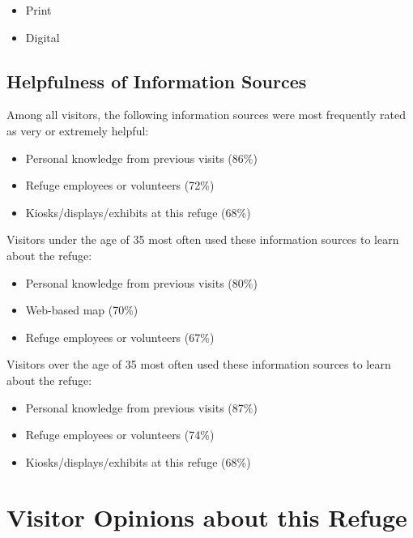 \documentclass[]{book}
\providecommand{\tightlist}{%
  \setlength{\itemsep}{0pt}\setlength{\parskip}{0pt}}
\begin{document}
\begin{itemize}
\tightlist
\item
  Print
\item
  Digital
\end{itemize}

\section{Helpfulness of Information
Sources}\label{helpfulness-of-information-sources}

Among all visitors, the following information sources were most
frequently rated as very or extremely helpful:

\begin{itemize}
\tightlist
\item
  Personal knowledge from previous visits (86\%)
\item
  Refuge employees or volunteers (72\%)
\item
  Kiosks/displays/exhibits at this refuge (68\%)
\end{itemize}

Visitors under the age of 35 most often used these information sources
to learn about the refuge:

\begin{itemize}
\tightlist
\item
  Personal knowledge from previous visits (80\%)
\item
  Web-based map (70\%)
\item
  Refuge employees or volunteers (67\%)
\end{itemize}

Visitors over the age of 35 most often used these information sources to
learn about the refuge:

\begin{itemize}
\tightlist
\item
  Personal knowledge from previous visits (87\%)
\item
  Refuge employees or volunteers (74\%)
\item
  Kiosks/displays/exhibits at this refuge (68\%)
\end{itemize}

\chapter{Visitor Opinions about this Refuge}\label{opin}
\end{document}
